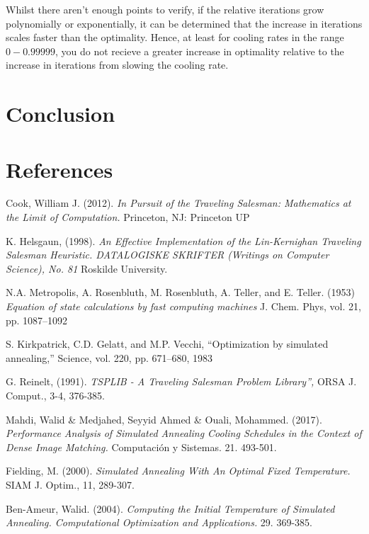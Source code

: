 \documentclass{article}
\begin{document}
Whilst there aren't enough points to verify, if the relative iterations grow polynomially or exponentially, it can be determined that the increase in iterations scales faster than the optimality.
Hence, at least for cooling rates in the range $0 - 0.99999$, you do not recieve a greater increase in optimality relative to the increase in iterations from slowing the cooling rate.



\newpage
\section{Conclusion}



\newpage
\section{References}

\begin{thebibliography}{9}

Cook, William J. (2012). \emph{In Pursuit of the Traveling Salesman: Mathematics at the Limit of Computation.} Princeton, NJ: Princeton UP

K. Helsgaun, (1998). \emph{An Effective Implementation of the Lin-Kernighan Traveling Salesman Heuristic. DATALOGISKE SKRIFTER (Writings on Computer Science), No. 81} Roskilde University.

N.A. Metropolis, A. Rosenbluth, M. Rosenbluth, A. Teller, and E. Teller. (1953) \emph{Equation of state calculations by
fast computing machines} J. Chem. Phys, vol. 21, pp. 1087–1092

S. Kirkpatrick, C.D. Gelatt, and M.P. Vecchi, “Optimization by simulated annealing,” Science, vol. 220, pp.
671–680, 1983

G. Reinelt, (1991). \emph{TSPLIB - A Traveling Salesman Problem Library”,} ORSA J. Comput., 3-4, 376-385.

Mahdi, Walid \& Medjahed, Seyyid Ahmed \& Ouali, Mohammed. (2017). \emph{Performance Analysis of Simulated Annealing Cooling Schedules in the Context of Dense Image Matching.} Computación y Sistemas. 21. 493-501.

Fielding, M. (2000). \emph{Simulated Annealing With An Optimal Fixed Temperature.} SIAM J. Optim., 11, 289-307.

Ben-Ameur, Walid. (2004). \emph{Computing the Initial Temperature of Simulated Annealing. Computational Optimization and Applications.} 29. 369-385.



\end{thebibliography}
\end{document}
